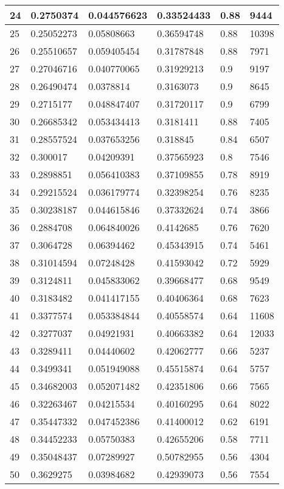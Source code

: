 \begin{longtable}{|l|l|l|l|l|l|}
24 & 0.2750374 & 0.044576623 & 0.33524433 & 0.88 & 9444 \\ \hline 
25 & 0.25052273 & 0.05808663 & 0.36594748 & 0.88 & 10398 \\ \hline 
26 & 0.25510657 & 0.059405454 & 0.31787848 & 0.88 & 7971 \\ \hline 
27 & 0.27046716 & 0.040770065 & 0.31929213 & 0.9 & 9197 \\ \hline 
28 & 0.26490474 & 0.0378814 & 0.3163073 & 0.9 & 8645 \\ \hline 
29 & 0.2715177 & 0.048847407 & 0.31720117 & 0.9 & 6799 \\ \hline 
30 & 0.26685342 & 0.053434413 & 0.3181411 & 0.88 & 7405 \\ \hline 
31 & 0.28557524 & 0.037653256 & 0.318845 & 0.84 & 6507 \\ \hline 
32 & 0.300017 & 0.04209391 & 0.37565923 & 0.8 & 7546 \\ \hline 
33 & 0.2898851 & 0.056410383 & 0.37109855 & 0.78 & 8919 \\ \hline 
34 & 0.29215524 & 0.036179774 & 0.32398254 & 0.76 & 8235 \\ \hline 
35 & 0.30238187 & 0.044615846 & 0.37332624 & 0.74 & 3866 \\ \hline 
36 & 0.2884708 & 0.064840026 & 0.4142685 & 0.76 & 7620 \\ \hline 
37 & 0.3064728 & 0.06394462 & 0.45343915 & 0.74 & 5461 \\ \hline 
38 & 0.31014594 & 0.07248428 & 0.41593042 & 0.72 & 5929 \\ \hline 
39 & 0.3124811 & 0.045833062 & 0.39668477 & 0.68 & 9549 \\ \hline 
40 & 0.3183482 & 0.041417155 & 0.40406364 & 0.68 & 7623 \\ \hline 
41 & 0.3377574 & 0.053384844 & 0.40558574 & 0.64 & 11608 \\ \hline 
42 & 0.3277037 & 0.04921931 & 0.40663382 & 0.64 & 12033 \\ \hline 
43 & 0.3289411 & 0.04440602 & 0.42062777 & 0.66 & 5237 \\ \hline 
44 & 0.3499341 & 0.051949088 & 0.45515874 & 0.64 & 5757 \\ \hline 
45 & 0.34682003 & 0.052071482 & 0.42351806 & 0.66 & 7565 \\ \hline 
46 & 0.32263467 & 0.04215534 & 0.40160295 & 0.64 & 8022 \\ \hline 
47 & 0.35447332 & 0.047452386 & 0.41400012 & 0.62 & 6191 \\ \hline 
48 & 0.34452233 & 0.05750383 & 0.42655206 & 0.58 & 7711 \\ \hline 
49 & 0.35048437 & 0.07289927 & 0.50782955 & 0.56 & 4304 \\ \hline 
50 & 0.3629275 & 0.03984682 & 0.42939073 & 0.56 & 7554 \\ \hline 
\end{longtable}